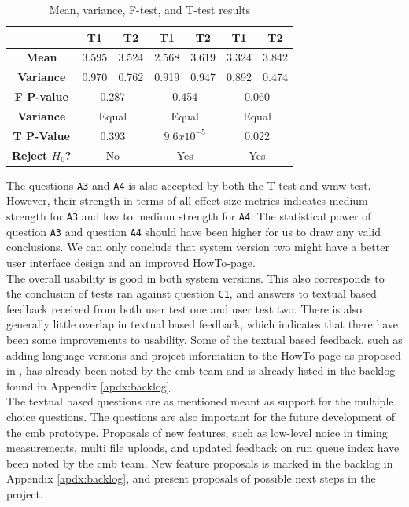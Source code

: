 \begin{table}[t!]
\begin{tabular}{|c||c|c||c|c||c|c||}
      &  T1 & T2 & T1 & T2 & T1 & T2 \\ \hline
      \textbf{Mean} & 3.595 & 3.524 & 2.568 & 3.619 & 3.324 & 3.842 \\ \hline
      \textbf{Variance} & 0.970 & 0.762 & 0.919 & 0.947 & 0.892 & 0.474 \\ \hline
      \textbf{F P-value} & \multicolumn{2}{c||}{0.287} & \multicolumn{2}{c||}{0.454} & \multicolumn{2}{c||}{0.060}\\ \hline
      \textbf{Variance} & \multicolumn{2}{c||}{Equal} & \multicolumn{2}{c||}{Equal} & \multicolumn{2}{c||}{Equal} \\ \hline
      \textbf{T P-Value} & \multicolumn{2}{c||}{0.393} & \multicolumn{2}{c||}{$9.6x10^{-5}$} & \multicolumn{2}{c||}{0.022} \\ \hline
      \textbf{Reject $H_0$?} & \multicolumn{2}{c||}{No} & \multicolumn{2}{c||}{Yes} & \multicolumn{2}{c||}{Yes} \\ \hline
    \end{tabular}
    \caption{Mean, variance, F-test, and T-test results}
    \label{tab:results-tests-all}
\end{table}

The questions \texttt{A3} and \texttt{A4} is also accepted by both the T-test and \gls{wmw}-test. However, their strength in terms of all effect-size metrics indicates medium strength for \texttt{A3} and low to medium strength for \texttt{A4}. The statistical power of question \texttt{A3} and question \texttt{A4} should have been higher for us to draw any valid conclusions. We can only conclude that system version two might have a better user interface design and an improved HowTo-page. \\

The overall usability is good in both system versions. This also corresponds to the conclusion of tests ran against question  \texttt{C1}, and answers to textual based feedback received from both user test one and user test two. There is also generally little overlap in textual based feedback, which indicates that there have been some improvements to usability. Some of the textual based feedback, such as adding language versions and project information to the HowTo-page as proposed in , has already been noted by the \gls{cmb} team and is already listed in the backlog found in Appendix \ref{apdx:backlog}. \\

The textual based questions are as mentioned meant as support for the multiple choice questions. The questions are also important for the future development of the \gls{cmb} prototype. Proposals of new features, such as low-level noice in timing measurements, multi file uploads, and updated feedback on run queue index have been noted by the \gls{cmb} team. New feature proposals is marked in the backlog in Appendix \ref{apdx:backlog}, and  present proposals of possible next steps in the project. \\

